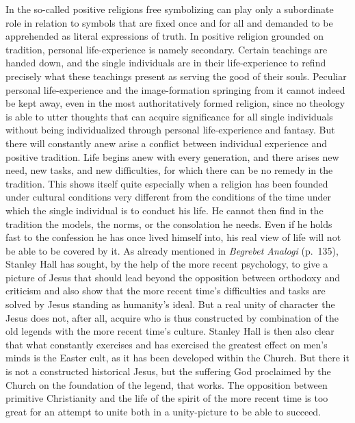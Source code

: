\documentclass[12pt]{book}
\newcommand{\opage}[1]{\marginnote{\footnotesize\textit{[#1]}}}
\begin{document}
In the so-called positive religions free symbolizing can play only a subordinate role in relation to symbols
that are fixed once and for all and demanded to be apprehended as literal expressions of truth. In positive
religion grounded on tradition, personal life-experience is namely secondary. Certain teachings are handed
down, and the single individuals are in their life-experience to refind precisely what these teachings
present as serving the good of their souls. Peculiar personal life-experience and the image-formation
springing from it cannot indeed be kept away, even in the most authoritatively formed religion, since no
theology is able \opage{104}to utter thoughts that can acquire significance for all single individuals without being
individualized through personal life-experience and fantasy. But there will constantly anew arise a conflict
between individual experience and positive tradition. Life begins anew with every generation, and there
arises new need, new tasks, and new difficulties, for which there can be no remedy in the tradition. This
shows itself quite especially when a religion has been founded under cultural conditions very different from
the conditions of the time under which the single individual is to conduct his life. He cannot then find in
the tradition the models, the norms, or the consolation he needs. Even if he holds fast to the confession he
has once lived himself into, his real view of life will not be able to be covered by it. As already
mentioned in \textit{Begrebet Analogi} (p.\ 135), Stanley Hall has sought, by the help of the more recent
psychology, to give a picture of Jesus that should lead beyond the opposition between orthodoxy and
criticism and also show that the more recent time's difficulties and tasks are solved by Jesus standing as
humanity's ideal. But a real unity of character the Jesus does not, after all, acquire who is thus
constructed by combination of the old legends with the more recent time's culture. Stanley Hall is then also
clear that what constantly exercises and has exercised the greatest effect on men's minds is the Easter
cult, as it has been developed within the Church. But there it is not a constructed historical Jesus, but
the suffering God proclaimed by the Church on the foundation of the legend, that works. The opposition
between primitive Christianity and the life of the spirit of the more recent time is too great for an attempt to unite
both in a unity-picture to be able to succeed.
\end{document}

